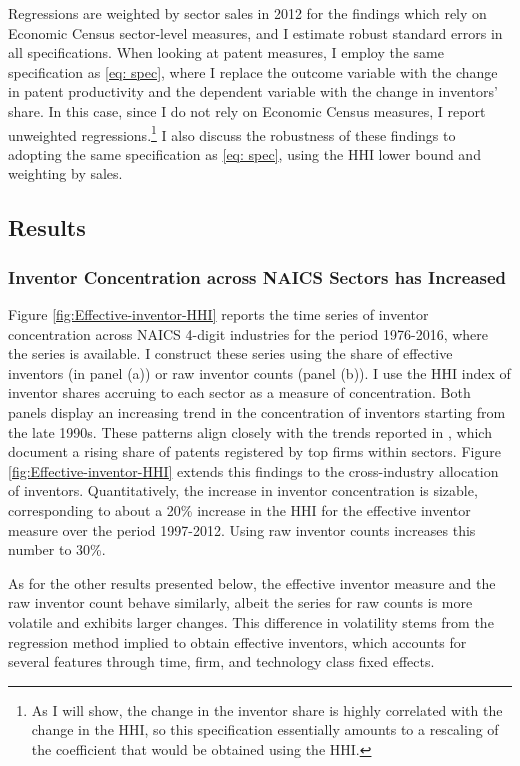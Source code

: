 Regressions are weighted by sector sales in 2012 for the findings
which rely on Economic Census sector-level measures, and I estimate
robust standard errors in all specifications. When looking at patent
measures, I employ the same specification as \ref{eq: spec}, where
I replace the outcome variable with the change in patent productivity
and the dependent variable with the change in inventors' share. In
this case, since I do not rely on Economic Census measures, I report
unweighted regressions.\footnote{As I will show, the change in the inventor share is highly correlated
with the change in the HHI, so this specification essentially amounts
to a rescaling of the coefficient that would be obtained using the
HHI.} I also discuss the robustness of these findings to adopting the same
specification as \ref{eq: spec}, using the HHI lower bound and weighting
by sales. 

\subsection{Results\label{subsec:MainResults}}

\subsubsection{Inventor Concentration across NAICS Sectors has Increased}

Figure \ref{fig:Effective-inventor-HHI} reports the time series of
inventor concentration across NAICS 4-digit industries for the period
1976-2016, where the \citet{goldschlagAlgorithmicLinksProbabilities2016}
series is available. I construct these series using the share of effective
inventors (in panel (a)) or raw inventor counts (panel (b)). I use
the HHI index of inventor shares accruing to each sector as a measure
of concentration. Both panels display an increasing trend in the concentration
of inventors starting from the late 1990s. These patterns align closely
with the trends reported in \citet{akcigitWhatHappenedBusiness2019a},
which document a rising share of patents registered by top firms within
sectors. Figure \ref{fig:Effective-inventor-HHI} extends this findings
to the cross-industry allocation of inventors. Quantitatively, the
increase in inventor concentration is sizable, corresponding to about
a 20\% increase in the HHI for the effective inventor measure over
the period 1997-2012. Using raw inventor counts increases this number
to 30\%. 

As for the other results presented below, the effective inventor measure
and the raw inventor count behave similarly, albeit the series for
raw counts is more volatile and exhibits larger changes. This difference
in volatility stems from the regression method implied to obtain effective
inventors, which accounts for several features through time, firm,
and technology class fixed effects.

